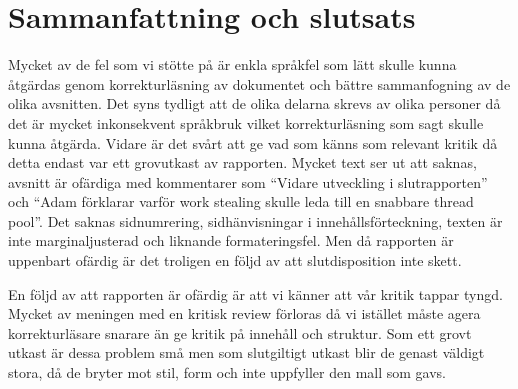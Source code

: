 \documentclass[a4paper]{article}
\begin{document}
\section{Sammanfattning och slutsats}
Mycket av de fel som vi stötte på är enkla språkfel som lätt skulle kunna åtgärdas genom korrekturläsning av dokumentet och bättre sammanfogning av de olika avsnitten. Det syns tydligt att
de olika delarna skrevs av olika personer då det är mycket inkonsekvent språkbruk vilket korrekturläsning som sagt skulle kunna åtgärda. Vidare är det svårt att ge vad som känns som relevant
kritik då detta endast var ett grovutkast av rapporten. Mycket text ser ut att saknas, avsnitt är ofärdiga med kommentarer som ``Vidare utveckling i slutrapporten'' och ``Adam förklarar varför
work stealing skulle leda till en snabbare thread pool''. Det saknas sidnumrering, sidhänvisningar i innehållsförteckning, texten är inte marginaljusterad och liknande formateringsfel. Men
då rapporten är uppenbart ofärdig är det troligen en följd av att slutdisposition inte skett. 

En följd av att rapporten är ofärdig är att vi känner att vår kritik tappar tyngd. Mycket av meningen med en kritisk review förloras då vi istället måste agera korrekturläsare snarare
än ge kritik på innehåll och struktur. Som ett grovt utkast är dessa problem små men som slutgiltigt utkast blir de genast väldigt stora, då de bryter mot stil, form och inte
uppfyller den mall som gavs.
\end{document}
